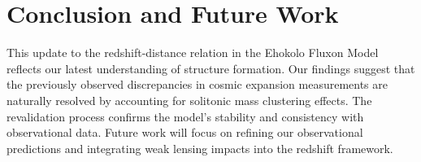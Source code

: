\documentclass[11pt]{article}
\begin{document}
\section{Conclusion and Future Work}
This update to the redshift-distance relation in the Ehokolo Fluxon Model reflects our latest understanding of structure formation. Our findings suggest that the previously observed discrepancies in cosmic expansion measurements are naturally resolved by accounting for solitonic mass clustering effects. The revalidation process confirms the model's stability and consistency with observational data. Future work will focus on refining our observational predictions and integrating weak lensing impacts into the redshift framework.
\end{document}
